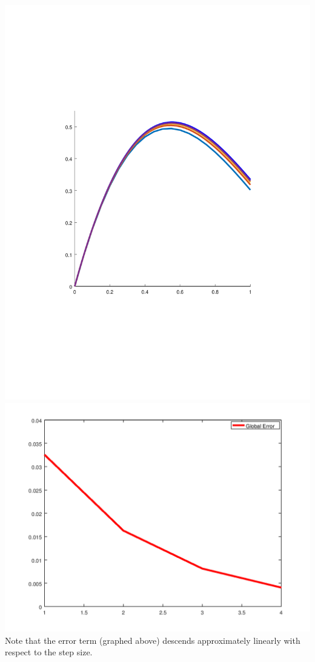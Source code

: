 \documentclass{jhwhw}
\begin{document}
\solution

    {\centering
	\includegraphics[scale=0.75]{p4} \\
	\includegraphics[scale=0.75]{p4_err} \\
    }
    \setlength\parindent{0pt}
    Note that the error term (graphed above) descends approximately linearly with respect to the step size.
    \inputminted[linenos,bgcolor=llgray,frame=lines,framesep=2mm]{octave}{p4.m}
\end{document}
